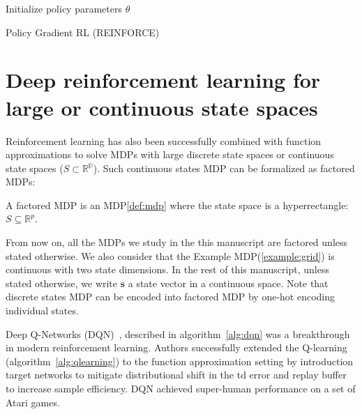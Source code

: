 \begin{algorithm}
    Initialize policy parameters $\theta$ \\
    \caption{Policy Gradient RL (REINFORCE)}\label{alg:reinforce}
\end{algorithm}


\section{Deep reinforcement learning for large or continuous state spaces}\label{sec:drl}

Reinforcement learning has also been successfully combined with function approximations \cite{td-gammon} to solve MDPs with large discrete state spaces or continuous state spaces ($S \subset \mathbb{R^p}$).
Such continuous states MDP can be formalized as factored MDPs\cite{fmdp}:

\begin{definition}\label{def:fmdp} A factored MDP is an MDP\ref{def:mdp} where the state space is a hyperrectangle: $S\subseteq \mathbb{R}^p$.
\end{definition}

From now on, all the MDPs we study in the this manuscript are factored unless stated otherwise. 
We also consider that the Example MDP(\ref{example:grid}) is continuous with two state dimensions.
In the rest of this manuscript, unless stated otherwise, we write $\boldsymbol{s}$ a state vector in a continuous space.
Note that discrete states MDP can be encoded into factored MDP by one-hot encoding individual states.

Deep Q-Networks (DQN)~\cite{dqn}, described in algorithm~\ref{alg:dqn} was a breakthrough in modern reinforcement learning.
Authors successfully extended the Q-learning (algorithm~\ref{alg:qlearning}) to the function approximation setting by introduction target networks to mitigate distributional shift in the td error and replay buffer to increase sample efficiency.
DQN achieved super-human performance on a set of Atari games.

